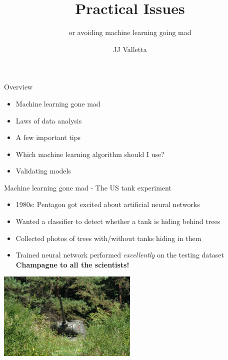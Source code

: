\documentclass[pdf]{beamer}
\title{Practical Issues}
\subtitle{or avoiding machine learning going mad}
\author{JJ Valletta}
\newif\ifplacelogo %
\begin{document}
\begin{frame}
\titlepage
\end{frame}
\placelogofalse %
\begin{frame}{Overview}
\begin{itemize}\addtolength{\itemsep}{0.5\baselineskip}
	\item<2-> Machine learning gone mad
	\item<3-> Laws of data analysis
 	\item<4-> A few important tips
	\item<5-> Which machine learning algorithm should I use?
	\item<6-> Validating models
\end{itemize}
\end{frame}
\begin{frame}{Machine learning gone mad - The US tank experiment}
\begin{itemize}\addtolength{\itemsep}{0.5\baselineskip}
	\item<1-> 1980s: Pentagon got excited about artificial neural networks
	\item<2-> Wanted a classifier to detect whether a tank is hiding behind trees
	\item<3-> Collected photos of trees with/without tanks hiding in them
	\item<4-> Trained neural network performed \textit{excellently} on the testing dataset\\
	\textbf{Champagne to all the scientists!}
\end{itemize}
\begin{center}
		\includegraphics[width=0.5\textwidth]{tank.jpg}
\end{center}
\end{frame}
\end{document}
